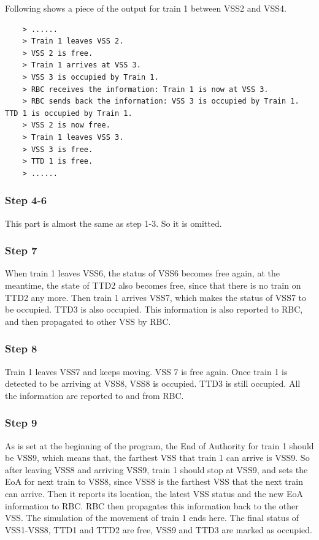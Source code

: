 \documentclass[article,dr=phil,type=msc,colorback,accentcolor=tud9c]{tudthesis}
\begin{document}
  	Following shows a piece of the output for train 1 between VSS2 and VSS4.
  	
  	\begin{verbatim}
  	> ......
  	> Train 1 leaves VSS 2.
  	> VSS 2 is free.
  	> Train 1 arrives at VSS 3.
  	> VSS 3 is occupied by Train 1.
  	> RBC receives the information: Train 1 is now at VSS 3.
  	> RBC sends back the information: VSS 3 is occupied by Train 1. TTD 1 is occupied by Train 1. 
  	> VSS 2 is now free.
  	> Train 1 leaves VSS 3.
  	> VSS 3 is free.
  	> TTD 1 is free.
  	> ......
  	\end{verbatim}
  	
  	\subsubsection{Step 4-6}
  	
    This part is almost the same as step 1-3. So it is omitted.
  	
  	\subsubsection{Step 7}
  	
  	When train 1 leaves VSS6, the status of VSS6 becomes free again, at the meantime, the state of TTD2 also becomes free, since that there is no train on TTD2 any more. Then train 1 arrives VSS7, which makes the status of VSS7 to be occupied. TTD3 is also occupied. This information is also reported to RBC, and then propagated to other VSS by RBC.
  	
  	\subsubsection{Step 8}
  	
  	Train 1 leaves VSS7 and keeps moving. VSS 7 is free again. Once train 1 is detected to be arriving at VSS8, VSS8 is occupied. TTD3 is still occupied. All the information are reported to and from RBC.
  	
  	\subsubsection{Step 9}
  	
  	As is set at the beginning of the program, the End of Authority for train 1 should be VSS9, which means that, the farthest VSS that train 1 can arrive is VSS9. So after leaving VSS8 and arriving VSS9, train 1 should stop at VSS9, and sets the EoA for next train to VSS8, since VSS8 is the farthest VSS that the next train can arrive. Then it reports its location, the latest VSS status and the new EoA information to RBC. RBC then propagates this information back to the other VSS. The simulation of the movement of train 1 ends here. The final status of VSS1-VSS8, TTD1 and TTD2 are free, VSS9 and TTD3 are marked as occupied.
  	 	  
\end{document}
